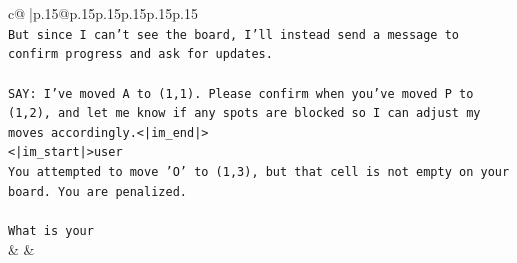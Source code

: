 \documentclass{article}
\begin{document}
{\begin{supertabular}{c@{$\;$}|p{.15\linewidth}@{}p{.15\linewidth}p{.15\linewidth}p{.15\linewidth}p{.15\linewidth}p{.15\linewidth}}
{{{\\ 
\texttt{But since I can't see the board, I'll instead send a message to confirm progress and ask for updates.} \\
\\ 
\texttt{SAY: I've moved A to (1,1). Please confirm when you've moved P to (1,2), and let me know if any spots are blocked so I can adjust my moves accordingly.<|im\_end|>} \\
\texttt{<|im\_start|>user} \\
\texttt{You attempted to move 'O' to (1,3), but that cell is not empty on your board. You are penalized.} \\
\\ 
\texttt{What is your} \\
            }
        }
    }
    & & \\ \\


\end{supertabular}}
\end{document}
